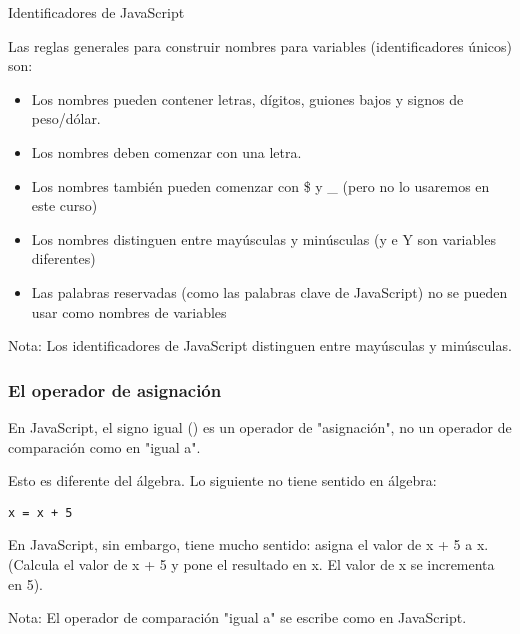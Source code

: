 \begin{frame}[c]{Identificadores de JavaScript}

  Las reglas generales para construir nombres para variables
  (identificadores únicos) son:

  \vspace{\baselineskip}
  \begin{itemize}
    \item Los nombres pueden contener letras, dígitos,
          guiones bajos y signos de peso/dólar.
    \item Los nombres deben comenzar con una letra.
    \item Los nombres también pueden comenzar con \$ y \_
          (pero no lo usaremos en este curso)
    \item Los nombres distinguen entre mayúsculas y
          minúsculas (y e Y son variables diferentes)
    \item Las palabras reservadas (como las palabras clave de
          JavaScript) no se pueden usar como nombres de variables
  \end{itemize}

  \vspace{\baselineskip}
  \begin{block}{Nota:}
    Los identificadores de JavaScript distinguen entre
    mayúsculas y minúsculas.
  \end{block}
\end{frame}

\begin{frame}[fragile]
  \frametitle{El operador de asignación}

  En JavaScript, el signo igual (\atri{=}) es un operador de
  "asignación", no un operador de comparación como en "igual a".

  \vspace{\baselineskip}
  Esto es diferente del álgebra. Lo siguiente no tiene sentido en álgebra:

  \vspace{\baselineskip}
  \begin{lstlisting}
x = x + 5
  \end{lstlisting}

  En JavaScript, sin embargo, tiene mucho sentido: asigna el valor de x + 5 a x.
  (Calcula el valor de x + 5 y pone el resultado en x. El valor de x se incrementa en 5).

  \begin{exampleblock}{Nota:}
    El operador de comparación "igual a" se escribe como
    \atri{==} en JavaScript.
  \end{exampleblock}
\end{frame}

